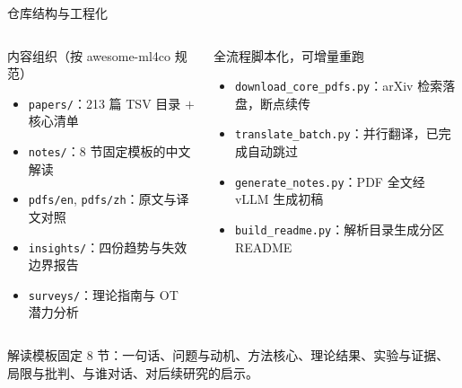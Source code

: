 \documentclass[aspectratio=169,10pt]{beamer}
\begin{document}
\begin{frame}{仓库结构与工程化}
  \begin{columns}[T]
      \begin{block}{内容组织（按 awesome-ml4co 规范）}
        \begin{itemize}
          \item \texttt{papers/}：213 篇 TSV 目录 $+$ 核心清单
          \item \texttt{notes/}：8 节固定模板的中文解读
          \item \texttt{pdfs/en}, \texttt{pdfs/zh}：原文与译文对照
          \item \texttt{insights/}：四份趋势与失效边界报告
          \item \texttt{surveys/}：理论指南与 OT 潜力分析
        \end{itemize}
      \end{block}
      \begin{block}{全流程脚本化，可增量重跑}
        \begin{itemize}
          \item \texttt{download\_core\_pdfs.py}：arXiv 检索落盘，断点续传
          \item \texttt{translate\_batch.py}：并行翻译，已完成自动跳过
          \item \texttt{generate\_notes.py}：PDF 全文经 vLLM 生成初稿
          \item \texttt{build\_readme.py}：解析目录生成分区 README
        \end{itemize}
      \end{block}
  \end{columns}
  \vspace{4pt}
  解读模板固定 8 节：一句话、问题与动机、方法核心、理论结果、实验与证据、局限与批判、与谁对话、对后续研究的启示。
\end{frame}
\end{document}
